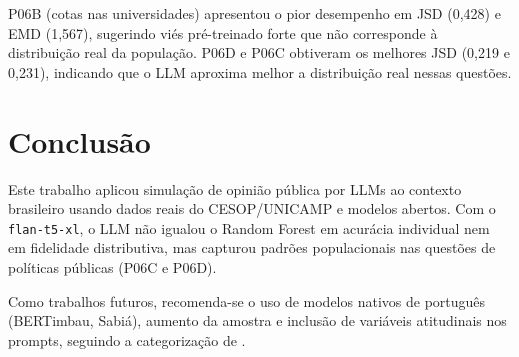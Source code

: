 \documentclass[12pt]{article}
\begin{document}
P06B (cotas nas universidades) apresentou o pior desempenho em JSD (0,428)
e EMD (1,567), sugerindo viés pré-treinado forte que não corresponde à
distribuição real da população. P06D e P06C obtiveram os melhores JSD
(0,219 e 0,231), indicando que o LLM aproxima melhor a distribuição real
nessas questões.


\section{Conclusão}

Este trabalho aplicou simulação de opinião pública por LLMs ao contexto
brasileiro usando dados reais do CESOP/UNICAMP e modelos abertos.
Com o \texttt{flan-t5-xl}, o LLM não igualou o Random Forest em acurácia
individual nem em fidelidade distributiva, mas capturou padrões populacionais
nas questões de políticas públicas (P06C e P06D).

Como trabalhos futuros, recomenda-se o uso de modelos nativos de português
(BERTimbau, Sabiá), aumento da amostra e inclusão de variáveis atitudinais
nos prompts, seguindo a categorização de \cite{miranda2025}.



\end{document}
